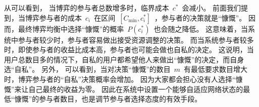 从可以看到，
当博弈的参与者总数增多时，临界成本~$c^*$~会减小。
前面我们提到，当博弈参与者的成本~$c_i$~在区间~$ [C_{\min}, c_i^*] $~，参与者的决策就是“慷慨”。
因而，最终博弈均衡中选择“慷慨”的概率~$P(c_i^*)$~也会随之降低。
这意味着，当系统中参与者较少时，参与者容易做出接受资源调整的决策。
而当系统参与者较多时，即使参与者的收益比成本高，参与者也可能会做也自私的决定。
这说明，当用户总数目多的情况下，自私的用户都希望他人来做出“慷慨”的决定，而自身选“自私”。
另外，
可以看到，当对决策“慷慨”的数目~$m$~有最低要求数目增大时，博弈参与者的“自私”决策概率会增加。
因为大家都会担心没有人选择“慷慨”来让自己最终的收益为零。
因此在系统中设置一个能够自适应网络状态的最低“慷慨”的参与者数目，也是调节参与者选择态度的有效手段。

